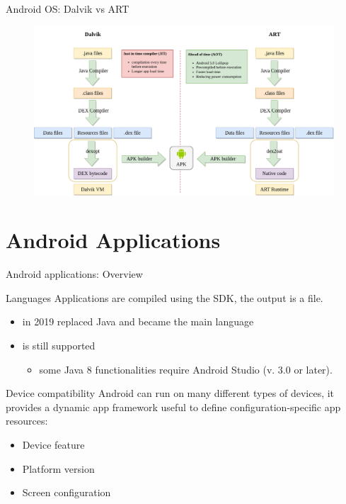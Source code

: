 \documentclass{beamer}
\begin{document}
\begin{frame}{Android OS: Dalvik vs ART}
  \begin{figure}
    \includegraphics[width=1\linewidth]{figures/dalvik-vs-art.png}
  \end{figure}
\end{frame}

\section{Android Applications}

\begin{frame}{Android applications: Overview}
    \begin{block}{Languages}
      Applications are compiled using the SDK, the output is a  file.
      \begin{itemize}
        \item {} in 2019 replaced Java and became the main language
        \item {} is still supported 
        \begin{itemize}
          \item some Java 8 functionalities require Android Studio (v. 3.0 or later).
        \end{itemize}
      \end{itemize}
    \end{block}
    \begin{block}{Device compatibility}
      Android can run on many different types of devices, it provides a dynamic app framework useful to
      define configuration-specific app resources:
      \begin{itemize}
        \item Device feature
        \item Platform version
        \item Screen configuration
      \end{itemize}
    \end{block}
\end{frame}
\end{document}
